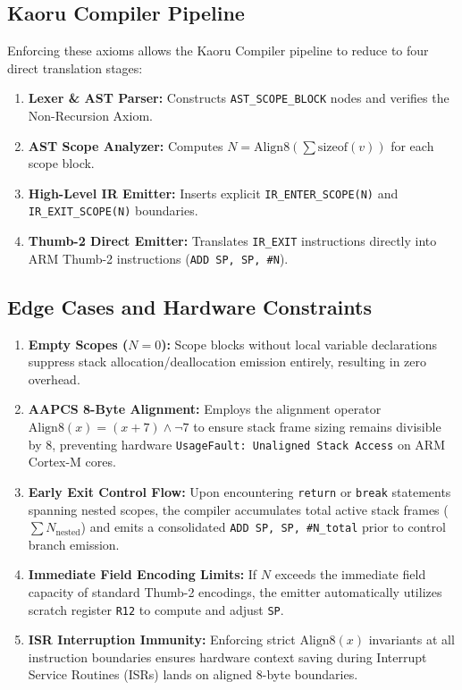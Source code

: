 \documentclass[conference]{IEEEtran}
\begin{document}
\subsection{Kaoru Compiler Pipeline}
Enforcing these axioms allows the Kaoru Compiler pipeline to reduce to four direct translation stages:

\begin{enumerate}
    \item \textbf{Lexer \& AST Parser:} Constructs \texttt{AST\_SCOPE\_BLOCK} nodes and verifies the Non-Recursion Axiom.
    \item \textbf{AST Scope Analyzer:} Computes $N = \mathrm{Align8}(\sum \mathrm{sizeof}(v))$ for each scope block.
    \item \textbf{High-Level IR Emitter:} Inserts explicit \texttt{IR\_ENTER\_SCOPE(N)} and \texttt{IR\_EXIT\_SCOPE(N)} boundaries.
    \item \textbf{Thumb-2 Direct Emitter:} Translates \texttt{IR\_EXIT} instructions directly into ARM Thumb-2 instructions (\texttt{ADD SP, SP, \#N}).
\end{enumerate}

\subsection{Edge Cases and Hardware Constraints}
\begin{enumerate}
    \item \textbf{Empty Scopes ($N = 0$):} Scope blocks without local variable declarations suppress stack allocation/deallocation emission entirely, resulting in zero overhead.
    \item \textbf{AAPCS 8-Byte Alignment:} Employs the alignment operator $\mathrm{Align8}(x) = (x + 7) \land \neg 7$ to ensure stack frame sizing remains divisible by 8, preventing hardware \texttt{UsageFault: Unaligned Stack Access} on ARM Cortex-M cores.
    \item \textbf{Early Exit Control Flow:} Upon encountering \texttt{return} or \texttt{break} statements spanning nested scopes, the compiler accumulates total active stack frames ($\sum N_{\text{nested}}$) and emits a consolidated \texttt{ADD SP, SP, \#N\_total} prior to control branch emission.
    \item \textbf{Immediate Field Encoding Limits:} If $N$ exceeds the immediate field capacity of standard Thumb-2 encodings, the emitter automatically utilizes scratch register \texttt{R12} to compute and adjust \texttt{SP}.
    \item \textbf{ISR Interruption Immunity:} Enforcing strict $\mathrm{Align8}(x)$ invariants at all instruction boundaries ensures hardware context saving during Interrupt Service Routines (ISRs) lands on aligned 8-byte boundaries.
\end{enumerate}
\end{document}
